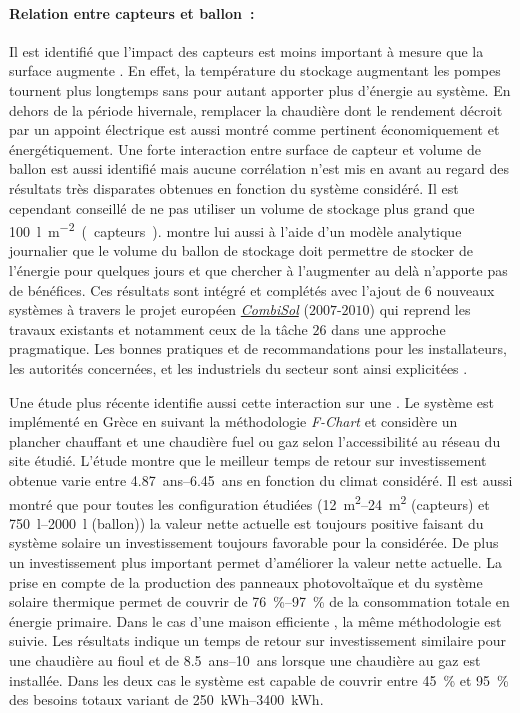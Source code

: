 \paragraph{Relation entre capteurs et ballon~:} %
\label{par:relation_entre_capteurs_et_ballon}
Il est identifié que l’impact des capteurs est moins important à mesure
que la surface augmente \parencite{Task26C2007}. En effet, la température du stockage augmentant les pompes
tournent plus longtemps sans pour autant apporter plus d’énergie au système. En dehors
de la période hivernale, remplacer la chaudière dont le rendement décroit par un appoint
électrique est aussi montré comme pertinent économiquement et énergétiquement.
Une forte interaction entre surface de capteur et volume de ballon est aussi identifié
mais aucune corrélation n’est mis en avant au regard des résultats très disparates
obtenues en fonction du système considéré. Il est cependant conseillé de ne pas utiliser
un volume de stockage plus grand que \SI{100}{\litre\per\metre\squared (capteurs)}.
\textcite{Lund200559} montre lui aussi à l’aide d’un modèle analytique journalier que le volume
du ballon de stockage doit permettre de stocker de l’énergie pour quelques jours et que
chercher à l’augmenter au delà n’apporte pas de bénéfices.
Ces résultats sont intégré et complétés avec l’ajout de $6$ nouveaux systèmes à travers
le projet européen \href{http://www.combisol.eu/}{\textit{CombiSol}} ($2007$-$2010$) qui reprend
les travaux existants et notamment ceux de la tâche $26$ dans une approche pragmatique.
Les bonnes pratiques et de recommandations pour les installateurs, les autorités concernées,
et les industriels du secteur sont ainsi explicitées \parencite{Thuer2011}.

Une étude plus récente \textcite{Tsalikis2015743} identifie aussi cette interaction sur
une . Le système est implémenté en Grèce en suivant la méthodologie
\textit{F-Chart} et considère un plancher chauffant et une chaudière fuel ou gaz selon
l’accessibilité au réseau du site étudié. L’étude montre que le meilleur temps de retour
sur investissement obtenue varie entre \SIrange{4.87}{6.45}{ans} en fonction du climat
considéré. Il est aussi montré que pour toutes les configuration étudiées
(\SIrange{12}{24}{\metre\squared} (capteurs) et \SIrange{750}{2000}{\litre} (ballon))
la valeur nette actuelle est toujours positive faisant du système solaire un
investissement toujours favorable pour la  considérée. De plus un
investissement plus important permet d’améliorer la valeur nette actuelle. La prise en
compte de la production des panneaux photovoltaïque et du système solaire thermique permet
de couvrir de \SIrange{76}{97}{\percent} de la consommation totale en énergie primaire.
Dans le cas d’une maison efficiente \parencite{Martinopoulos2014130}, la même méthodologie
est suivie. Les résultats indique un temps de retour sur investissement similaire pour une
chaudière au fioul et de \SIrange{8.5}{10}{ans} lorsque une chaudière au gaz est installée.
Dans les deux cas le système est capable de couvrir entre \SI{45}{\percent} et
\SI{95}{\percent} des besoins totaux variant de \SIrange{250}{3400}{kWh}.

